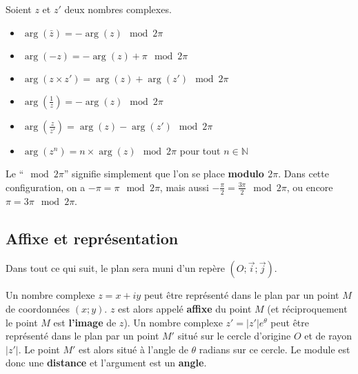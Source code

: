 	\begin{formula}[Formules]
		Soient $z$ et $z'$ deux nombres complexes.
		\begin{itemize}
			\item $\operatorname{arg}(\bar{z}) = - \operatorname{arg}(z) \mod 2\pi$
			\item $\operatorname{arg}(- z) = - \operatorname{arg}(z) + \pi \mod 2\pi$
			\item $\operatorname{arg}(z \times z') = \operatorname{arg}(z) + \operatorname{arg}(z') \mod 2\pi$
			\item $\displaystyle{\operatorname{arg}\left(\frac{1}{z}\right) = - \operatorname{arg}(z) \mod 2\pi}$
			\item $\displaystyle{\operatorname{arg}\left(\frac{z}{z'}\right) = \operatorname{arg}(z) - \operatorname{arg}(z') \mod 2\pi}$
			\item $\operatorname{arg}(z^n) = n \times \operatorname{arg}(z) \mod 2\pi$ pour tout $n \in \mathbb{N}$
		\end{itemize}
	\end{formula}
	
	\begin{tip}
		Le ``$\mod 2\pi$'' signifie simplement que l'on se place \textbf{modulo $2\pi$}. Dans cette configuration, on a $-\pi = \pi \mod 2\pi$, mais aussi $-\frac{\pi}{2} = \frac{3 \pi}{2} \mod 2\pi$, ou encore $\pi = 3\pi \mod 2\pi$.
	\end{tip}
	
	\subsection{Affixe et représentation}
	
	Dans tout ce qui suit, le plan sera muni d'un repère $(O; \overrightarrow{i}; \overrightarrow{j})$.
	
	\begin{formula}
		Un nombre complexe $z = x+iy$ peut être représenté dans le plan par un point $M$ de coordonnées $(x; y)$. $z$ est alors appelé \textbf{affixe} du point $M$ (et réciproquement le point $M$ est \textbf{l'image} de $z$).
		\newpar
		Un nombre complexe $z' = |z'| e^{\theta}$ peut être représenté dans le plan par un point $M'$ situé sur le cercle d'origine $O$ et de rayon
		$|z'|$. Le point $M'$ est alors situé à l'angle de $\theta$ radians sur ce cercle. Le module est donc une \textbf{distance} et l'argument est un \textbf{angle}.
	\end{formula}
	
